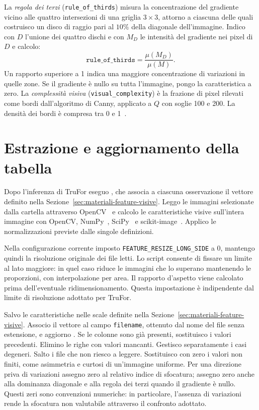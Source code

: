 La \emph{regola dei terzi} (\texttt{rule\_of\_thirds}) misura la concentrazione del gradiente vicino alle quattro intersezioni di una griglia $3\times3$, attorno a ciascuna delle quali costruisco un disco di raggio pari al $10\%$ della diagonale dell'immagine. Indico con $D$ l'unione dei quattro dischi e con $M_D$ le intensità del gradiente nei pixel di $D$ e calcolo:
\begin{equation}
    \texttt{rule\_of\_thirds}=\frac{\mu(M_D)}{\mu(M)}.
    \label{eq:feature-regola-terzi}
\end{equation}
Un rapporto superiore a 1 indica una maggiore concentrazione di variazioni in quelle zone. Se il gradiente è nullo su tutta l'immagine, pongo la caratteristica a zero. La \emph{complessità visiva} (\texttt{visual\_complexity}) è la frazione di pixel rilevati come bordi dall'algoritmo di Canny, applicato a $Q$ con soglie 100 e 200. La densità dei bordi è compresa tra 0 e 1~\cite{4767851}.

\section{Estrazione e aggiornamento della tabella}
\label{sec:metodi-feature-estrazione}

Dopo l'inferenza di TruFor eseguo , che associa a ciascuna osservazione il vettore definito nella Sezione~\ref{sec:materiali-feature-visive}. Leggo le immagini selezionate dalla cartella  attraverso OpenCV~\cite{opencv_library} e calcolo le caratteristiche visive sull'intera immagine con OpenCV, NumPy~\cite{harris2020array}, SciPy~\cite{2020SciPy-NMeth} e scikit-image~\cite{scikit-learn}. Applico le normalizzazioni previste dalle singole definizioni.

Nella configurazione corrente imposto \texttt{FEATURE\_RESIZE\_LONG\_SIDE} a 0, mantengo quindi la risoluzione originale dei file letti. Lo script consente di fissare un limite al lato maggiore: in quel caso riduce le immagini che lo superano mantenendo le proporzioni, con interpolazione per area. Il rapporto d'aspetto viene calcolato prima dell'eventuale ridimensionamento. Questa impostazione è indipendente dal limite di risoluzione adottato per TruFor.

Salvo le caratteristiche nelle scale definite nella Sezione~\ref{sec:materiali-feature-visive}. Associo il vettore al campo \texttt{filename}, ottenuto dal nome del file senza estensione, e aggiorno . Se le colonne sono già presenti, sostituisco i valori precedenti. Elimino le righe con valori mancanti. Gestisco separatamente i casi degeneri. Salto i file che non riesco a leggere. Sostituisco con zero i valori non finiti, come asimmetria e curtosi di un'immagine uniforme. Per una direzione priva di variazioni assegno zero al relativo indice di sfocatura; assegno zero anche alla dominanza diagonale e alla regola dei terzi quando il gradiente è nullo. Questi zeri sono convenzioni numeriche: in particolare, l'assenza di variazioni rende la sfocatura non valutabile attraverso il confronto adottato.

